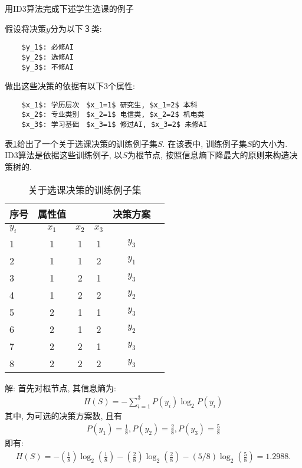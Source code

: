 \begin{example}
用ID3算法完成下述学生选课的例子

假设将决策$y$分为以下３类:
\begin{Verbatim}
    $y_1$: 必修AI
    $y_2$: 选修AI
    $y_3$: 不修AI
\end{Verbatim}

做出这些决策的依据有以下3个属性:
\begin{Verbatim}
    $x_1$: 学历层次　$x_1=1$ 研究生, $x_1=2$ 本科
    $x_2$: 专业类别　$x_2=1$ 电信类, $x_2=2$ 机电类
    $x_3$: 学习基础　$x_3=1$ 修过AI, $x_3=2$ 未修AI
\end{Verbatim}
\end{example}

表\ref{AItable20122435}给出了一个关于选课决策的训练例子集$S$. 在该表中, 训练例子集$S$的大小为. ID3算法是依据这些训练例子, 以$S$为根节点, 按照信息熵下降最大的原则来构造决策树的.
\begin{table} [!tb]
\caption{关于选课决策的训练例子集}
\begin{center}
\begin{tabular} {lccccc}
\hline
序号&	属性值	&&&决策方案\\
\hline
$y_i$&$x_1$&$x_2$&$x_3$\\
1	&1	&1	&1&	$y_3$\\
2	&1&	1&	2&	$y_1$\\
3	&1&2&1&$y_3$\\
4&1&2&2&$y_2$\\
5&2&1&1&$y_3$\\
6&2&1&2&$y_2$\\
7&2&2&1&$y_3$\\
8&2&2&2&$y_3$\\
\hline
\end{tabular}
\end{center}
\label{AItable20122435}
\end{table}

解:  首先对根节点, 其信息熵为:
\begin{align}
  H(S)=-\sum_{i=1}^{3} P\left(y_{i}\right) \log_ {2} P\left(y_{i}\right)
\end{align}
其中, 为可选的决策方案数, 且有
\begin{align}
  P(y_1)=\frac 1 8, P(y_2)=\frac 2 8, P(y_3)=\frac 5 8
\end{align}
即有:
\begin{align}
  H(S)= -(\frac 1 8)\log_2(\frac 1 8)- (\frac 2 8)\log_ 2(\frac 2 8)- (5/8)\log_ 2(\frac 5 8) =1.2988.
\end{align}

